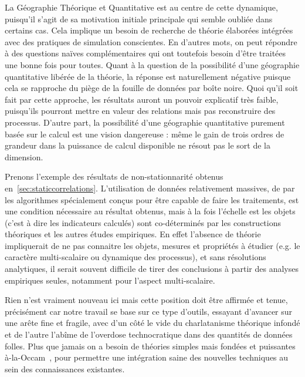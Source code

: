 {La Géographie Théorique et Quantitative est au centre de cette dynamique, puisqu'il s'agit de sa motivation initiale principale qui semble oubliée dans certains cas. Cela implique un besoin de recherche de théorie élaborées intégrées avec des pratiques de simulation conscientes. En d'autres mots, on peut répondre à des questions naïves complémentaires qui ont toutefois besoin d'être traitées une bonne fois pour toutes. Quant à la question de la possibilité d'une géographie quantitative libérée de la théorie, la réponse est naturellement négative puisque cela se rapproche du piège de la fouille de données par boîte noire. Quoi qu'il soit fait par cette approche, les résultats auront un pouvoir explicatif très faible, puisqu'ils pourront mettre en valeur des relations mais pas reconstruire des processus. D'autre part, la possibilité d'une géographie quantitative purement basée sur le calcul est une vision dangereuse : même le gain de trois ordres de grandeur dans la puissance de calcul disponible ne résout pas le sort de la dimension.

Prenons l'exemple des résultats de non-stationnarité obtenus en~\ref{sec:staticcorrelations}. L'utilisation de données relativement massives, de par les algorithmes spécialement conçus pour être capable de faire les traitements, est une condition nécessaire au résultat obtenus, mais à la fois l'échelle est les objets (c'est à dire les indicateurs calculés) sont co-déterminés par les constructions théoriques et les autres études empiriques. En effet l'absence de théorie impliquerait de ne pas connaitre les objets, mesures et propriétés à étudier (e.g. le caractère multi-scalaire ou dynamique des processus), et sans résolutions analytiques, il serait souvent difficile de tirer des conclusions à partir des analyses empiriques seules, notamment pour l'aspect multi-scalaire.

Rien n'est vraiment nouveau ici mais cette position doit être affirmée et tenue, précisément car notre travail se base sur ce type d'outils, essayant d'avancer sur une arête fine et fragile, avec d'un côté le vide du charlatanisme théorique infondé et de l'autre l'abîme de l'overdose technocratique dans des quantités de données folles. Plus que jamais on a besoin de théories simples mais fondées et puissantes {\`a}-la-Occam~\cite{batty2016theoretical}, pour permettre une intégration saine des nouvelles techniques au sein des connaissances existantes.
}






